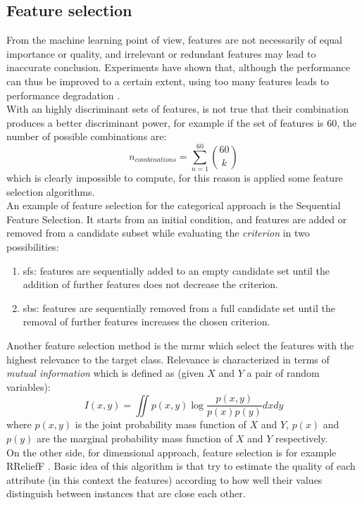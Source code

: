 \subsection{Feature selection}
From the machine learning point of view, features are not necessarily of equal importance or quality, and irrelevant or redundant features may lead to inaccurate conclusion. Experiments have shown that, although the performance can thus be improved to a certain extent, using too many features leads to performance degradation \cite{zhang2017feature}.
\\
With an highly discriminant sets of features, is not true that their combination produces a better discriminant power, for example if the set of features is 60, the number of possible combinations are:
\begin{equation}
	n_{combinations} = \sum_{n=1}^{60} \binom{60}{k}
\end{equation}
which is clearly impossible to compute, for this reason is applied some feature selection algorithms.
\\ \indent
An example of feature selection for the categorical approach is the Sequential Feature Selection. It starts from an initial condition, and features are added or removed from a candidate subset while evaluating the \textit{criterion} in two possibilities:
\begin{enumerate}
	\item \gls{sfs}: features are sequentially added to an empty candidate set until the addition of further features does not decrease the criterion.
	\item \gls{sbs}: features are sequentially removed from a full candidate set until the removal of further features increases the chosen criterion.
\end{enumerate}
Another feature selection method is the \gls{mrmr} which select the features with the highest relevance to the target class. Relevance is characterized in terms of \textit{mutual information} which is defined as (given $X$ and $Y$ a pair of random variables):
\begin{equation}
	I(x,y)=\iint p(x,y) \log\dfrac{p(x,y)}{p(x)p(y)} dxdy
\end{equation}
where $p(x,y)$ is the joint probability mass function of $X$ and $Y$, $p(x)$ and $p(y)$ are the marginal probability mass function of $X$ and $Y$ respectively.
\\ \indent
On the other side, for dimensional approach, feature selection is for example RReliefF \cite{robnik2003theoretical}. Basic idea of this algorithm is that try to estimate the quality of each attribute (in this context the features) according to how well their values distinguish between instances that are close each other.
